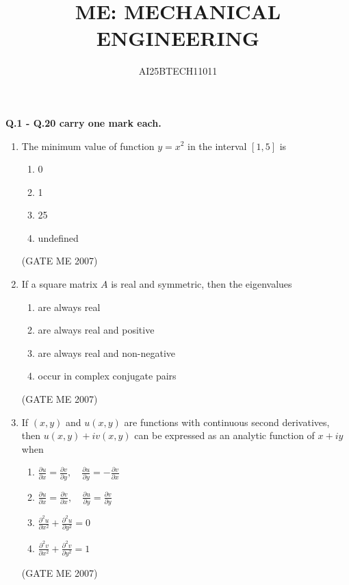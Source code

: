 \documentclass[journal]{IEEEtran}
\begin{document}
\title{
ME: MECHANICAL ENGINEERING}
\author{AI25BTECH11011}
\maketitle
\renewcommand{\thefigure}{\theenumi}
\renewcommand{\thetable}{\theenumi}

\textbf{Q.1 - Q.20 carry one mark each.}

\begin{enumerate}

\item The minimum value of function \( y = x^2 \) in the interval \([1,5]\) is
\begin{multicols}{4}
\begin{enumerate}
\item 0
\item 1
\item 25
\item undefined
\end{enumerate}
\end{multicols}
\hfill (GATE ME 2007)

\item If a square matrix \( A \) is real and symmetric, then the eigenvalues
\begin{multicols}{2}
\begin{enumerate}
\item are always real
\item are always real and positive
\item are always real and non-negative
\item occur in complex conjugate pairs
\end{enumerate}
\end{multicols}
\hfill (GATE ME 2007)

\item If \( (x, y) \) and \( u(x, y) \) are functions with continuous second derivatives, then \( u(x, y) + iv(x, y) \) can be expressed as an analytic function of \( x + iy \) when
\begin{enumerate}
\item \( \frac{\partial u}{\partial x} = \frac{\partial v}{\partial y}, \quad \frac{\partial u}{\partial y} = -\frac{\partial v}{\partial x} \)
\item \( \frac{\partial u}{\partial x} = \frac{\partial v}{\partial x}, \quad \frac{\partial u}{\partial y} = \frac{\partial v}{\partial y} \)
\item \( \frac{\partial^2 u}{\partial x^2} + \frac{\partial^2 u}{\partial y^2} = 0 \)
\item \( \frac{\partial^2 v}{\partial x^2} + \frac{\partial^2 v}{\partial y^2} = 1 \)
\end{enumerate}
\hfill (GATE ME 2007)


\end{enumerate}
\end{document}

